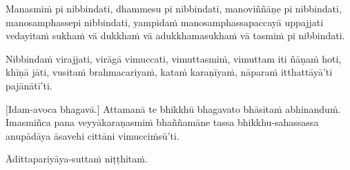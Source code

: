 Manasmiṁ pi nibbindati, dhammesu pi nibbindati, manoviññāṇe pi
nibbindati, manosamphassepi nibbindati, yampidaṁ manosamphassapaccayā
uppajjati vedayitaṁ sukhaṁ vā dukkhaṁ vā adukkhamasukhaṁ vā tasmiṁ pi
nibbindati.

Nibbindaṁ virajjati, virāgā vimuccati, vimuttasmiṁ, vimuttam iti ñāṇaṁ
hoti, khīṇā jāti, vusitaṁ brahmacariyaṁ, kataṁ karaṇīyaṁ, nāparaṁ
itthattāyā'ti pajānātī'ti.

\enlargethispage{\baselineskip}

[Idam-avoca bhagavā.] Attamanā te bhikkhū bhagavato bhāsitaṁ abhinanduṁ.
Imasmiñca pana veyyākaraṇasmiṁ bhaññamāne tassa bhikkhu-sahassassa
anupādāya āsavehi cittāni vimucciṁsū'ti.

Ādittapariyāya-suttaṁ niṭṭhitaṁ.

\resumeNormalText

